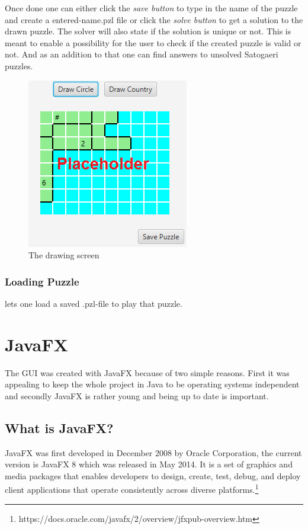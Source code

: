 Once done one can either click the \emph{save button} to type in the name of the puzzle and create a entered-name.pzl file or click the \emph{solve button} to get a solution to the drawn puzzle. The solver will also state if the solution is unique or not. This is meant to enable a possibility for the user to check if the created puzzle is valid or not. And as an addition to that one can find answers to unsolved Satogaeri puzzles.
\begin{figure}
  \centering
  \includegraphics[scale=1]{Pictures/drawing_screen.png} 
  \caption{The drawing screen}
  \label{fig:drawing_screen}
\end{figure}

\subsection{Loading Puzzle} lets one load a saved .pzl-file to play that puzzle.

\chapter{JavaFX} \label{JavaFX}
The GUI was created with JavaFX because of two simple reasons. First it was appealing to keep the whole project in Java to be operating systems independent and secondly JavaFX is rather young and being up to date is important.

\section{What is JavaFX?}
JavaFX was first developed in December 2008 by Oracle Corporation, the current version is JavaFX 8 which was released in May 2014. It is a set of graphics and media packages that enables developers to design, create, test, debug, and deploy client applications that operate consistently across diverse platforms.\footnote{https://docs.oracle.com/javafx/2/overview/jfxpub-overview.htm} 

